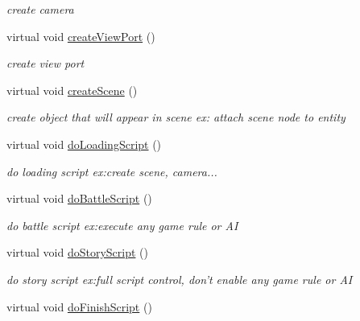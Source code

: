 \begin{DoxyCompactItemize}
\begin{DoxyCompactList}\small\item\em create camera \end{DoxyCompactList}\item 
\hypertarget{class_stage4_a0e399197fb7f6a5f701e6fb76442bd78}{
virtual void \hyperlink{class_stage4_a0e399197fb7f6a5f701e6fb76442bd78}{createViewPort} ()}
\label{class_stage4_a0e399197fb7f6a5f701e6fb76442bd78}

\begin{DoxyCompactList}\small\item\em create view port \end{DoxyCompactList}\item 
\hypertarget{class_stage4_a2713f9449bd2fd01bd6b62378dbb2910}{
virtual void \hyperlink{class_stage4_a2713f9449bd2fd01bd6b62378dbb2910}{createScene} ()}
\label{class_stage4_a2713f9449bd2fd01bd6b62378dbb2910}

\begin{DoxyCompactList}\small\item\em create object that will appear in scene ex: attach scene node to entity \end{DoxyCompactList}\item 
\hypertarget{class_stage4_a8f4fe7877bd7a4e144ed65a5050829d9}{
virtual void \hyperlink{class_stage4_a8f4fe7877bd7a4e144ed65a5050829d9}{doLoadingScript} ()}
\label{class_stage4_a8f4fe7877bd7a4e144ed65a5050829d9}

\begin{DoxyCompactList}\small\item\em do loading script ex:create scene, camera... \end{DoxyCompactList}\item 
\hypertarget{class_stage4_aefa487a4f6e5a78adf008a664689d1d5}{
virtual void \hyperlink{class_stage4_aefa487a4f6e5a78adf008a664689d1d5}{doBattleScript} ()}
\label{class_stage4_aefa487a4f6e5a78adf008a664689d1d5}

\begin{DoxyCompactList}\small\item\em do battle script ex:execute any game rule or AI \end{DoxyCompactList}\item 
\hypertarget{class_stage4_abb2d8adb401d89bbd16a08d361f771ea}{
virtual void \hyperlink{class_stage4_abb2d8adb401d89bbd16a08d361f771ea}{doStoryScript} ()}
\label{class_stage4_abb2d8adb401d89bbd16a08d361f771ea}

\begin{DoxyCompactList}\small\item\em do story script ex:full script control, don't enable any game rule or AI \end{DoxyCompactList}\item 
\hypertarget{class_stage4_ac407aa7f4ff7c6f2d8b2f6e182df1cdd}{
virtual void \hyperlink{class_stage4_ac407aa7f4ff7c6f2d8b2f6e182df1cdd}{doFinishScript} ()}
\label{class_stage4_ac407aa7f4ff7c6f2d8b2f6e182df1cdd}


\end{DoxyCompactItemize}
